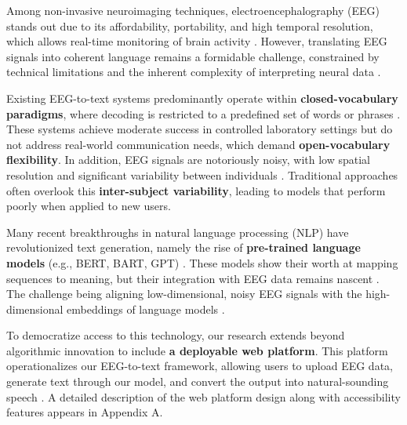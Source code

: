 \documentclass[journal]{IEEEtran}
\begin{document}
Among non-invasive neuroimaging techniques, electroencephalography (EEG) stands out due to its affordability, portability, and high temporal resolution, which allows real-time monitoring of brain activity \cite{Hollenstein2018, Panachakel2021}. However, translating EEG signals into coherent language remains a formidable challenge, constrained by technical limitations and the inherent complexity of interpreting neural data \cite{Duan2023, Feng2023}.

Existing EEG-to-text systems predominantly operate within \textbf{closed-vocabulary paradigms}, where decoding is restricted to a predefined set of words or phrases \cite{Wang2022, Pandarinath2017}. These systems achieve moderate success in controlled laboratory settings but do not address real-world communication needs, which demand \textbf{open-vocabulary flexibility}. In addition, EEG signals are notoriously noisy, with low spatial resolution and significant variability between individuals \cite{Jeng2020}. Traditional approaches often overlook this \textbf{inter-subject variability}, leading to models that perform poorly when applied to new users.

Many recent breakthroughs in natural language processing (NLP) have revolutionized text generation, namely the rise of \textbf{pre-trained language models} (e.g., BERT, BART, GPT) \cite{Devlin2018, Lewis2019}. These models show their worth at mapping sequences to meaning, but their integration with EEG data remains nascent \cite{Caucheteux2022}. The challenge being aligning low-dimensional, noisy EEG signals with the high-dimensional embeddings of language models \cite{Tang2023}.

To democratize access to this technology, our research extends beyond algorithmic innovation to include \textbf{a deployable web platform}. This platform operationalizes our EEG-to-text framework, allowing users to upload EEG data, generate text through our model, and convert the output into natural-sounding speech \cite{OpenAI2023}. A detailed description of the web platform design along with accessibility features appears in Appendix A.
\end{document}
